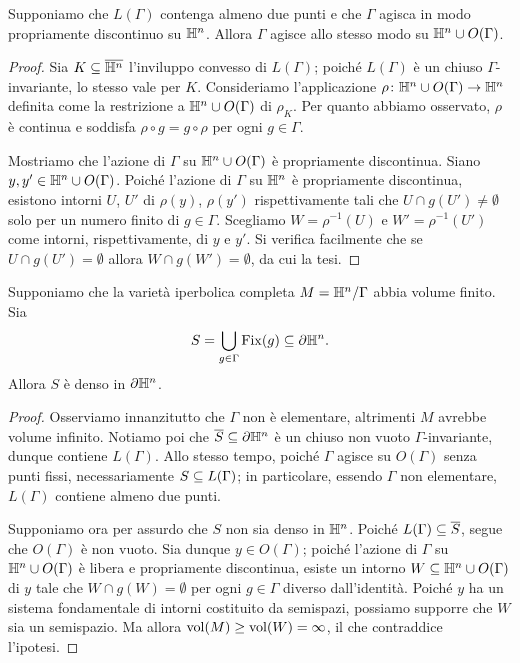 \begin{proposition*}
Supponiamo che $L(\Gamma)$ contenga almeno due punti e che $\Gamma$ agisca in modo propriamente discontinuo su $\mathbb{H}^n$. Allora $\Gamma$ agisce allo stesso modo su $\mathbb{H}^n\cup O(\Gamma)$.
\end{proposition*}
\begin{proof}
Sia $K\subseteq\overline{\mathbb{H}^n}$ l'inviluppo convesso di $L(\Gamma)$; poiché $L(\Gamma)$ è un chiuso $\Gamma$-invariante, lo stesso vale per $K$. Consideriamo l'applicazione $\rho\colon\mathbb{H}^n\cup O(\Gamma)\to\mathbb{H}^n$ definita come la restrizione a $\mathbb{H}^n\cup O(\Gamma)$ di $\rho_K$. Per quanto abbiamo osservato, $\rho$ è continua e soddisfa $\rho\circ g=g\circ\rho$ per ogni $g\in\Gamma$.

Mostriamo che l'azione di $\Gamma$ su $\mathbb{H}^n\cup O(\Gamma)$ è propriamente discontinua. Siano $y,y'\in\mathbb{H}^n\cup O(\Gamma)$. Poiché l'azione di $\Gamma$ su $\mathbb{H}^n$ è propriamente discontinua, esistono intorni $U$, $U'$ di $\rho(y)$, $\rho(y')$ rispettivamente tali che $U\cap g(U')\neq\emptyset$ solo per un numero finito di $g\in\Gamma$. Scegliamo $W=\rho^{-1}(U)$ e $W'=\rho^{-1}(U')$ come intorni, rispettivamente, di $y$ e $y'$. Si verifica facilmente che se $U\cap g(U')=\emptyset$ allora $W\cap g(W')=\emptyset$, da cui la tesi.
\end{proof}

\begin{theorem*}
Supponiamo che la varietà iperbolica completa $M=\mathbb{H}^n/\Gamma$ abbia volume finito. Sia
\[
S=\bigcup_{g\in\Gamma}\operatorname{Fix}(g)\subseteq\partial\mathbb{H}^n.
\]
Allora $S$ è denso in $\partial\mathbb{H}^n$.
\end{theorem*}
\begin{proof}
Osserviamo innanzitutto che $\Gamma$ non è elementare, altrimenti $M$ avrebbe volume infinito. Notiamo poi che $\overline{S}\subseteq\partial\mathbb{H}^n$ è un chiuso non vuoto $\Gamma$-invariante, dunque contiene $L(\Gamma)$. Allo stesso tempo, poiché $\Gamma$ agisce su $O(\Gamma)$ senza punti fissi, necessariamente $S\subseteq L(\Gamma)$; in particolare, essendo $\Gamma$ non elementare, $L(\Gamma)$ contiene almeno due punti.

Supponiamo ora per assurdo che $S$ non sia denso in $\mathbb{H}^n$. Poiché $L(\Gamma)\subseteq\overline{S}$, segue che $O(\Gamma)$ è non vuoto. Sia dunque $y\in O(\Gamma)$; poiché l'azione di $\Gamma$ su $\mathbb{H}^n\cup O(\Gamma)$ è libera e propriamente discontinua, esiste un intorno $W\subseteq\mathbb{H}^n\cup O(\Gamma)$ di $y$ tale che $W\cap g(W)=\emptyset$ per ogni $g\in\Gamma$ diverso dall'identità. Poiché $y$ ha un sistema fondamentale di intorni costituito da semispazi, possiamo supporre che $W$ sia un semispazio. Ma allora $\operatorname{vol}(M)\ge\operatorname{vol}(W)=\infty$, il che contraddice l'ipotesi.
\end{proof}

